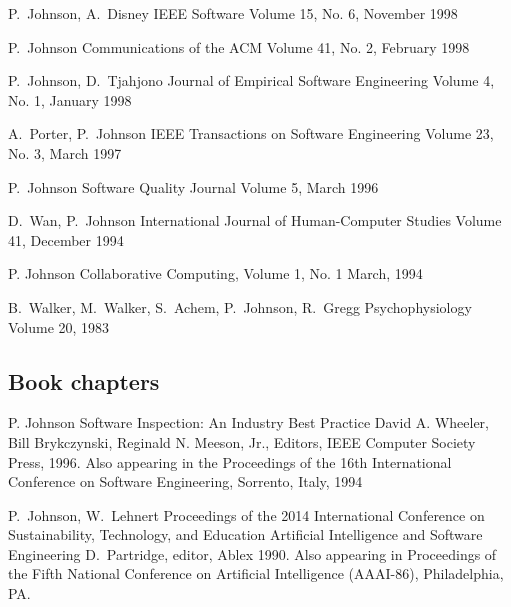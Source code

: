 \documentclass[11pt,letterpaper,sans]{moderncv} %
\begin{document}
          {P.~Johnson, A.~Disney}
          {IEEE Software}
          {Volume 15, No. 6, November 1998}

          {P.~Johnson}
          {Communications of the ACM}
          {Volume 41, No. 2, February 1998}

          {P.~Johnson, D.~Tjahjono}
          {Journal of Empirical Software Engineering}
          {Volume 4, No. 1, January 1998}

          {A.~Porter, P.~Johnson}
          {IEEE Transactions on Software Engineering}
          {Volume 23, No. 3, March 1997}

          {P.~Johnson}
          {Software Quality Journal}
          {Volume 5, March 1996}

          {D.~Wan, P.~Johnson}
          {International Journal of Human-Computer Studies}
          {Volume 41, December 1994}

          {P. Johnson}
          {Collaborative Computing, Volume 1, No. 1}
          {March, 1994}

          {B.~Walker, M.~Walker, S.~Achem, P.~Johnson, R.~Gregg}
          {Psychophysiology}
          {Volume 20, 1983}

\subsection{Book chapters}


          {P. Johnson}
          {Software Inspection:  An Industry Best Practice}
          {David A. Wheeler, Bill Brykczynski, Reginald N. Meeson, Jr., Editors, IEEE Computer Society Press, 1996.
          Also appearing in the Proceedings of the 16th International Conference on Software Engineering, Sorrento, Italy, 1994}

          {P.~Johnson, W.~Lehnert}
Proceedings of the 2014 International Conference on Sustainability, Technology, and Education          {Artificial Intelligence and Software Engineering}
          {D.~Partridge, editor, Ablex 1990. Also appearing in Proceedings of the Fifth National Conference on
  Artificial Intelligence (AAAI-86), Philadelphia, PA.}
\end{document}
